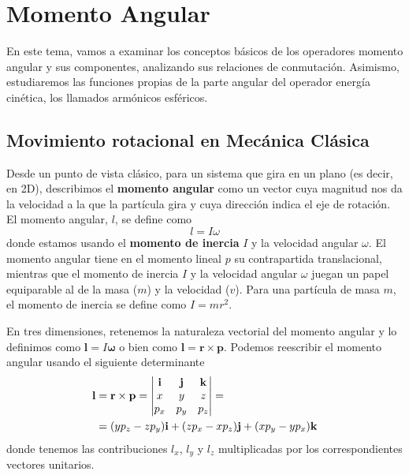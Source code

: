 \chapter{Momento Angular}
En este tema, vamos a examinar los conceptos básicos de los
operadores momento angular y sus componentes, analizando sus
relaciones de conmutación. Asimismo, estudiaremos las
funciones propias de la parte angular del operador 
energía cinética, los llamados armónicos esféricos.

\section{Movimiento rotacional en Mecánica Clásica}
Desde un punto de vista clásico, para un sistema que gira 
en un plano (es decir, en 2D), describimos el \textbf{momento
angular} como un vector cuya magnitud nos da la velocidad 
a la que la partícula gira y cuya dirección indica el eje
de rotación. El momento angular, $l$, se define como
\begin{equation}
    l=I\omega
\end{equation}
donde estamos usando el \textbf{momento de inercia} $I$ y
la velocidad angular $\omega$. El momento angular tiene 
en el momento lineal $p$ su contrapartida translacional, mientras que el momento de inercia $I$ y la velocidad
angular $\omega$ juegan un papel equiparable al de la masa
($m$) y la velocidad ($v$). Para una partícula de masa $m$, 
el momento de inercia se define como $I=mr^2$.


En tres dimensiones, retenemos la naturaleza vectorial
del momento angular y lo definimos como 
$\mathbf{l}= I\bm{\omega}$
o bien como $\mathbf{l} = \mathbf{r}\times\mathbf{p}$.
Podemos reescribir el momento angular usando el siguiente
determinante
\begin{align}
    \mathbf{l}&=\mathbf{r}\times\mathbf{p} =
    \begin{vmatrix}
\mathbf{i} & \mathbf{j} & \mathbf{k}  \\ 
x & y & z \\ 
p_x & p_y & p_z  \notag
\end{vmatrix} = \\
&= (yp_z-zp_y)\mathbf{i} +
(zp_x-xp_z)\mathbf{j} +
(xp_y-yp_x)\mathbf{k}
\end{align}
donde tenemos las contribuciones $l_x$, $l_y$ y $l_z$
multiplicadas por los correspondientes vectores unitarios.

